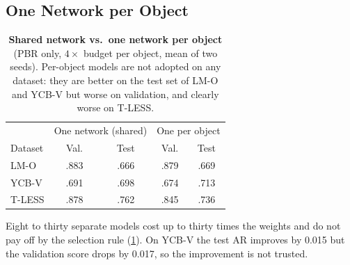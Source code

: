 \subsection{One Network per Object}
\label{sec:acc:per_object}
\begin{table}[t]
  \centering
  \small
  \begin{tabular}{@{}lcccc@{}}
    \toprule
    & \multicolumn{2}{c}{One network (shared)} & \multicolumn{2}{c}{One per object} \\
    Dataset & Val. & Test & Val. & Test \\
    \midrule
    LM-O  & .883 & .666 & .879 & .669 \\
    YCB-V & .691 & .698 & .674 & .713 \\
    T-LESS & .878 & .762 & .845 & .736 \\
    \bottomrule
  \end{tabular}
  \caption{\textbf{Shared network vs.\ one network per object} (PBR only, $4\times$ budget per
  object, mean of two seeds). Per-object models are not adopted on any dataset: they are better on
  the test set of LM-O and YCB-V but worse on validation, and clearly worse on T-LESS.}
  \label{tab:acc_per_object}
\end{table}
Eight to thirty separate models cost up to thirty times the weights and do not pay off by the
selection rule (\cref{tab:acc_per_object}). On YCB-V the test AR improves by 0.015 but the
validation score drops by 0.017, so the improvement is not trusted.

